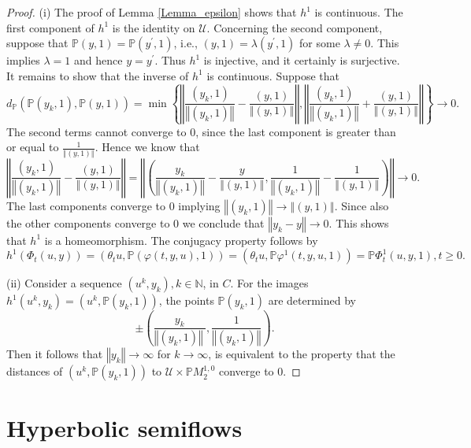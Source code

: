 \documentclass{siamltex}%
\begin{document}
\begin{proof}
(i) The proof of Lemma \ref{Lemma_epsilon} shows that $h^{1}$ is continuous.
The first component of $h^{1}$ is the identity on $\mathcal{U}$. Concerning
the second component, suppose that $\mathbb{P}(y,1)=\mathbb{P}(y^{\prime},1)$,
i.e., $(y,1)=\lambda(y^{\prime},1)$ for some $\lambda\not =0$. This implies
$\lambda=1$ and hence $y=y^{\prime}$. Thus $h^{1}$ is injective, and it
certainly is surjective. It remains to show that the inverse of $h^{1}$ is
continuous. Suppose that
\[
d_{\mathbb{P}}(\mathbb{P}(y_{k},1),\mathbb{P}(y,1))=\min\left\{  \left\Vert
\frac{(y_{k},1)}{\left\Vert (y_{k},1)\right\Vert }-\frac{(y,1)}{\left\Vert
(y,1)\right\Vert }\right\Vert ,\left\Vert \frac{(y_{k},1)}{\left\Vert
(y_{k},1)\right\Vert }+\frac{(y,1)}{\left\Vert (y,1)\right\Vert }\right\Vert
\right\}  \rightarrow0.
\]
The second terms cannot converge to $0$, since the last component is greater
than or equal to $\frac{1}{\left\Vert (y,1)\right\Vert }$. Hence we know that%
\[
\left\Vert \frac{(y_{k},1)}{\left\Vert (y_{k},1)\right\Vert }-\frac
{(y,1)}{\left\Vert (y,1)\right\Vert }\right\Vert =\left\Vert \left(
\frac{y_{k}}{\left\Vert (y_{k},1)\right\Vert }-\frac{y}{\left\Vert
(y,1)\right\Vert },\frac{1}{\left\Vert (y_{k},1)\right\Vert }-\frac
{1}{\left\Vert (y,1)\right\Vert }\right)  \right\Vert \rightarrow0.
\]
The last components converge to $0$ implying $\left\Vert (y_{k},1)\right\Vert
\rightarrow\left\Vert (y,1)\right\Vert $. Since also the other components
converge to $0$ we conclude that $\left\Vert y_{k}-y\right\Vert \rightarrow0$.
This shows that $h^{1}$ is a homeomorphism. The conjugacy property follows by%
\[
h^{1}(\Phi_{t}(u,y))=(\theta_{t}u,\mathbb{P}\left(  \varphi(t,y,u),1\right)
)=(\theta_{t}u,\mathbb{P}\varphi^{1}(t,y,u,1))=\mathbb{P}\Phi_{t}%
^{1}(u,y,1),t\geq0.
\]


(ii) Consider a sequence $(u^{k},y_{k}),k\in\mathbb{N}$, in $C$. For the
images $h^{1}(u^{k},y_{k})=(u^{k},\mathbb{P}(y_{k},1))$, the points
$\mathbb{P}(y_{k},1)$ are determined by%
\[
\pm\left(  \frac{y_{k}}{\left\Vert (y_{k},1)\right\Vert ~},\frac{1}{\left\Vert
(y_{k},1)\right\Vert }\right)  .
\]
Then it follows that $\left\Vert y_{k}\right\Vert \rightarrow\infty$ for
$k\rightarrow\infty$, is equivalent to the property that the distances of
$(u^{k},\mathbb{P}(y_{k},1))$ to $\mathcal{U}\times\mathbb{P}M_{2}^{1,0}$
converge to $0$.
\end{proof}

\section{Hyperbolic semiflows\label{Section7}}
\end{document}
